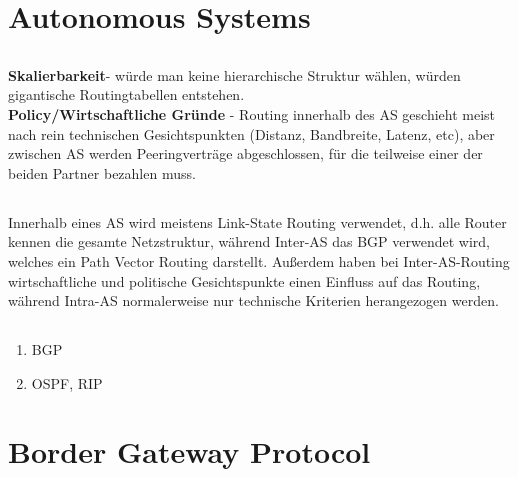 \documentclass[a4paper,
			llpt,
			solution,
			accentcolor=tud2d,
			colorbacktitle
			]
			{tudexercise}
\newcommand{\8}{$\infty$}
\begin{document}
\section{Autonomous Systems}
\subsection{}
\textbf{Skalierbarkeit}- würde man keine hierarchische Struktur wählen, würden gigantische Routingtabellen entstehen. \\
\textbf{Policy/Wirtschaftliche Gründe} - Routing innerhalb des AS geschieht meist nach rein technischen Gesichtspunkten (Distanz, Bandbreite, Latenz, etc), aber zwischen AS werden Peeringverträge abgeschlossen, für die teilweise einer der beiden Partner bezahlen muss.
\subsection{}
Innerhalb eines AS wird meistens Link-State Routing verwendet, d.h. alle Router kennen die gesamte Netzstruktur, während Inter-AS das BGP verwendet wird, welches ein Path Vector Routing darstellt. Außerdem haben bei Inter-AS-Routing wirtschaftliche und politische Gesichtspunkte einen Einfluss auf das Routing, während Intra-AS normalerweise nur technische Kriterien herangezogen werden.
\subsection{}
\begin{enumerate}
\item BGP
\item OSPF, RIP
\end{enumerate}
\section{Border Gateway Protocol}
\end{document}
